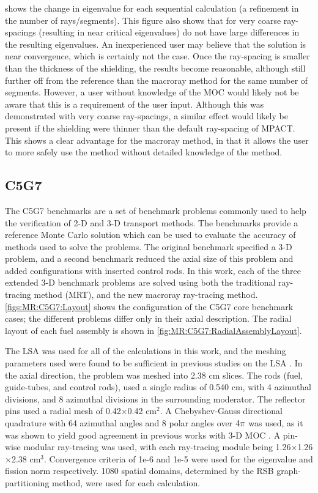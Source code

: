 {{{       shows the change in eigenvalue for each sequential calculation (a refinement in the number of rays/segments).
      This figure also shows that for very coarse ray-spacings (resulting in near critical eigenvalues) do not have large differences in the resulting eigenvalues.
      An inexperienced user may believe that the solution is near convergence, which is certainly not the case.
      Once the ray-spacing is smaller than the thickness of the shielding, the results become reasonable, although still further off from the reference than the macroray method for the same number of segments.
      However, a user without knowledge of the \ac{MOC} would likely not be aware that this is a requirement of the user input.
      Although this was demonstrated with very coarse ray-spacings, a similar effect would likely be present if the shielding were thinner than the default ray-spacing of MPACT.
      This shows a clear advantage for the macroray method, in that it allows the user to more safely use the method without detailed knowledge of the method.
    }

    \subsection{C5G7}{\label{ssec:MR:C5G7}
      The C5G7 \cite{Smith2002,Smith2006} benchmarks are a set of benchmark problems commonly used to help the verification of 2-D and 3-D transport methods.
      The benchmarks provide a reference Monte Carlo solution which can be used to evaluate the accuracy of methods used to solve the problems.
      The original benchmark specified a 3-D problem, and a second benchmark reduced the axial size of this problem and added configurations with inserted control rods.
      In this work, each of the three extended 3-D benchmark problems are solved using both the traditional ray-tracing method (\ac{MRT}), and the new macroray ray-tracing method.
      \cref{figs:MR:C5G7:Layout} shows the configuration of the C5G7 core benchmark cases; the different problems differ only in their axial description.
      The radial layout of each fuel assembly is shown in \cref{fig:MR:C5G7:RadialAssemblyLayout}.

      The \ac{LSA} was used for all of the calculations in this work, and the meshing parameters used were found to be sufficient in previous studies on the \ac{LSA} \cite{Gunow2016}.
      In the axial direction, the problem was meshed into 2.38 cm slices.
      The rods (fuel, guide-tubes, and control rods), used a single radius of 0.540 cm, with 4 azimuthal divisions, and 8 azimuthal divisions in the surrounding moderator.
      The reflector pins used a radial mesh of 0.42$\times$0.42 cm$^2$.
      A Chebyshev-Gauss directional quadrature with 64 azimuthal angles and 8 polar angles over $4\pi$ was used, as it was shown to yield good agreement in previous works with 3-D \ac{MOC} \cite{Kochunas2013}.
      A pin-wise modular ray-tracing was used, with each ray-tracing module being 1.26$\times$1.26$\times$2.38 cm$^3$.
      Convergence criteria of 1e-6 and 1e-5 were used for the eigenvalue and fission norm respectively.
      1080 spatial domains, determined by the \ac{RSB} graph-partitioning method, were used for each calculation.

}}}
